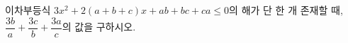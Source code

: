 이차부등식 $3x^2+2(a+b+c)x+ab+bc+ca\le 0$의 해가 단 한 개 존재할 때, $\dfrac{3b}{a}+\dfrac{3c}{b}+\dfrac{3a}{c}$의 값을 구하시오. 
